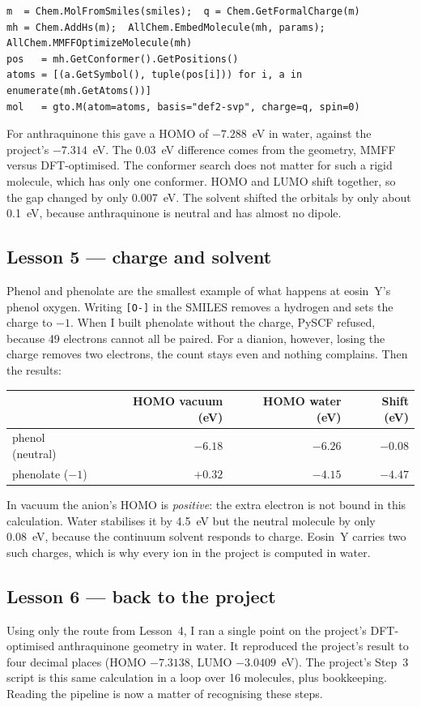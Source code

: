 \documentclass[11pt,a4paper]{article}
\begin{document}
\begin{lstlisting}
m  = Chem.MolFromSmiles(smiles);  q = Chem.GetFormalCharge(m)
mh = Chem.AddHs(m);  AllChem.EmbedMolecule(mh, params);  AllChem.MMFFOptimizeMolecule(mh)
pos   = mh.GetConformer().GetPositions()
atoms = [(a.GetSymbol(), tuple(pos[i])) for i, a in enumerate(mh.GetAtoms())]
mol   = gto.M(atom=atoms, basis="def2-svp", charge=q, spin=0)
\end{lstlisting}

\noindent For anthraquinone this gave a HOMO of $-7.288$~eV in water, against the project's
$-7.314$~eV. The 0.03~eV difference comes from the geometry, MMFF versus DFT-optimised. The
conformer search does not matter for such a rigid molecule, which has only one conformer. HOMO and
LUMO shift together, so the gap changed by only 0.007~eV. The solvent shifted the orbitals by only
about 0.1~eV, because anthraquinone is neutral and has almost no dipole.

\subsection*{Lesson 5 --- charge and solvent}
Phenol and phenolate are the smallest example of what happens at eosin~Y's phenol oxygen. Writing
\texttt{[O-]} in the SMILES removes a hydrogen and sets the charge to $-1$. When I built phenolate
without the charge, PySCF refused, because 49 electrons cannot all be paired. For a dianion,
however, losing the charge removes two electrons, the count stays even and nothing complains.
Then the results:

\begin{center}\small
\begin{tabular}{@{}lrrr@{}}
\toprule
& HOMO vacuum (eV) & HOMO water (eV) & Shift (eV) \\
\midrule
phenol (neutral) & $-6.18$ & $-6.26$ & $-0.08$ \\
phenolate ($-1$) & $+0.32$ & $-4.15$ & $-4.47$ \\
\bottomrule
\end{tabular}
\end{center}

In vacuum the anion's HOMO is \emph{positive}: the extra electron is not bound in this calculation.
Water stabilises it by 4.5~eV but the neutral molecule by only 0.08~eV, because the continuum
solvent responds to charge. Eosin~Y carries two such charges, which is why every ion in the project
is computed in water.

\subsection*{Lesson 6 --- back to the project}
Using only the route from Lesson~4, I ran a single point on the project's DFT-optimised
anthraquinone geometry in water. It reproduced the project's result to four decimal places (HOMO
$-7.3138$, LUMO $-3.0409$~eV). The project's Step~3 script is this same calculation in a loop over
16 molecules, plus bookkeeping. Reading the pipeline is now a matter of recognising these steps.
\end{document}
